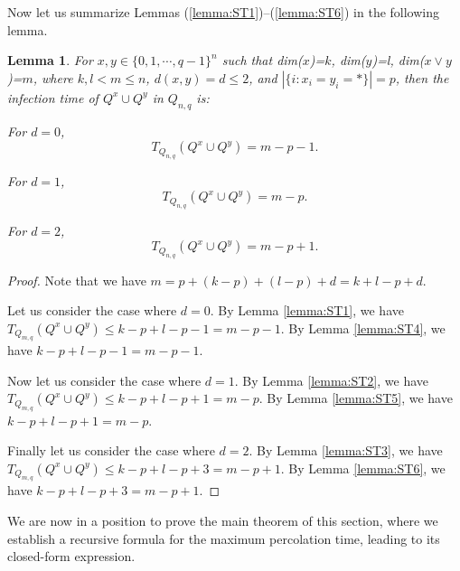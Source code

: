 \documentclass[reqno,11pt]{amsart}
\newtheorem{lemma}[theorem]{Lemma}
\renewcommand{\leq}{\leqslant}
\begin{document}
Now let us summarize Lemmas (\ref{lemma:ST1})--(\ref{lemma:ST6}) in the following lemma. 
\begin{lemma} \label{lemma:summary}
For $x,y \in \{0,1,\cdots,q-1\}^n$ such that dim($x$)=$k$, dim($y$)=l, dim($x \vee y$)=$m$, where $k,l <m \leq n$, $d(x,y)=d \leq 2$, and $|\{i: x_i=y_i=* \}|=p$, then the infection time of $Q^x \cup Q^y$ in $Q_{n,q}$ is:

For $d=0$, $$T_{Q_{n,q}}(Q^x \cup Q^y)=m-p-1.$$

For $d=1$, $$T_{Q_{n,q}}(Q^x \cup Q^y)=m-p.$$

For $d=2$, $$T_{Q_{n,q}}(Q^x \cup Q^y)=m-p+1.$$
\end{lemma}
\begin{proof}
Note that we have $m=p+(k-p)+(l-p)+d=k+l-p+d$. 

Let us consider the case where $d=0$. By Lemma \ref{lemma:ST1}, we have 
$T_{Q_{m,q}}(Q^x \cup Q^y) \leq k-p+l-p-1=m-p-1$. By Lemma \ref{lemma:ST4}, we have $k-p+l-p-1=m-p-1$.

Now let us consider the case where $d=1$. By Lemma \ref{lemma:ST2}, we have 
$T_{Q_{m,q}}(Q^x \cup Q^y) \leq k-p+l-p+1=m-p$. By Lemma \ref{lemma:ST5}, we have $k-p+l-p+1=m-p$.

Finally let us consider the case where $d=2$. By Lemma \ref{lemma:ST3}, we have $T_{Q_{m,q}}(Q^x \cup Q^y) \leq k-p+l-p+3=m-p+1$. By Lemma \ref{lemma:ST6}, we have $k-p+l-p+3=m-p+1$.
\end{proof}


We are now in a position to prove the main theorem of this section, where we establish a recursive formula for the maximum percolation time, leading to its closed-form expression.
\end{document}
